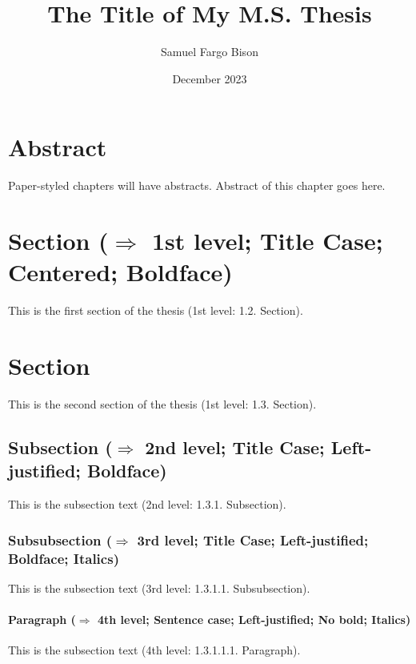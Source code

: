 \documentclass[ms-thesis,12pt,mathdesign]{ndsu-thesis-2022}
\title{The Title of My M.S. Thesis}
\author{Samuel Fargo Bison}
\date{December 2023}
\begin{document}

\section{Abstract}
Paper-styled chapters will have abstracts. Abstract of this chapter goes here. \kant[1]

\section{Section ($\Rightarrow$ 1st level; Title Case; Centered; Boldface)}
This is the first section of the thesis (1st level: 1.2. Section). \kant[2]

\section{Section}
This is the second section of the thesis (1st level: 1.3. Section). \kant[3]

\subsection{Subsection ($\Rightarrow$ 2nd level; Title Case; Left-justified; Boldface)}
This is the subsection text (2nd level: 1.3.1. Subsection). \kant[4]

\subsubsection{Subsubsection ($\Rightarrow$ 3rd level; Title Case; Left-justified; Boldface; Italics)}
This is the subsection text (3rd level: 1.3.1.1. Subsubsection). \kant[5]

\paragraph{Paragraph ($\Rightarrow$ 4th level; Sentence case; Left-justified; No bold; Italics)}
This is the subsection text (4th level: 1.3.1.1.1. Paragraph). \kant[6]
\end{document}
